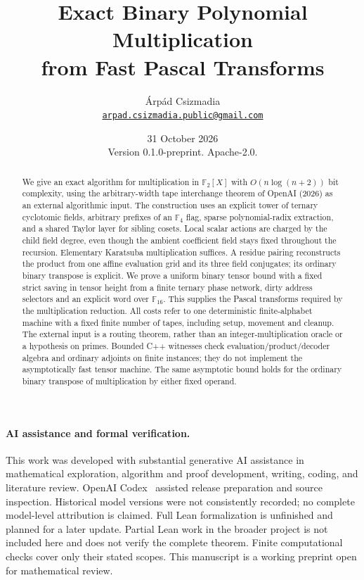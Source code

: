 \documentclass[11pt]{article}
\title{Exact Binary Polynomial Multiplication\\from Fast Pascal Transforms}
\author{\'Arp\'ad Csizmadia\\
\small\href{mailto:arpad.csizmadia.public@gmail.com}{\texttt{arpad.csizmadia.public@gmail.com}}}
\date{31 October 2026\\ \small Version 0.1.0-preprint. Apache-2.0.}
\theoremstyle{definition}
\newcommand{\F}{\mathbb F}
\begin{document}
\maketitle
\begin{abstract}
We give an exact algorithm for multiplication in $\F_2[X]$ with
$O(n\log(n+2))$ bit complexity, using the arbitrary-width tape
interchange theorem of OpenAI (2026) as an external algorithmic input.
The construction uses an explicit tower of
ternary cyclotomic fields, arbitrary prefixes of an $\F_4$ flag, sparse
polynomial-radix extraction, and a shared Taylor layer for sibling
cosets. Local scalar actions are charged by the child field degree,
even though the ambient coefficient field stays fixed throughout the
recursion. Elementary Karatsuba multiplication suffices. A residue
pairing reconstructs the product from one affine evaluation grid and
its three field conjugates; its ordinary binary transpose is explicit.
We prove a uniform binary tensor bound with a fixed strict saving in
tensor height from a finite ternary phase network, dirty address
selectors and an explicit word over $\F_{16}$. This supplies the
Pascal transforms required by the multiplication reduction. All costs
refer to one deterministic finite-alphabet machine with a fixed finite
number of tapes, including setup, movement and cleanup. The external
input is a routing theorem, rather than an integer-multiplication
oracle or a hypothesis on primes. Bounded C++ witnesses
check evaluation/product/decoder algebra and ordinary adjoints on
finite instances; they do not implement the asymptotically fast tensor machine.
The same asymptotic bound holds for the ordinary binary transpose of
multiplication by either fixed operand.
\end{abstract}
\paragraph{AI assistance and formal verification.}
This work was developed with substantial generative AI assistance in
mathematical exploration, algorithm and proof development, writing,
coding, and literature review. OpenAI Codex~\cite{CodexTool26}
assisted release preparation and source inspection. Historical
model versions were not consistently recorded; no complete
model-level attribution is claimed. Full Lean formalization is unfinished
and planned for a later update. Partial Lean work in the broader project
is not included here and does not verify the complete theorem.
Finite computational checks cover only their stated scopes. This
manuscript is a working preprint open for mathematical review.
\tableofcontents








\appendix



\end{document}
